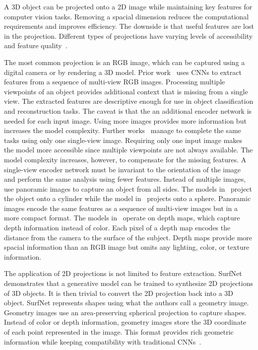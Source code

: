 A 3D object can be projected onto a 2D image while maintaining key features for computer vision tasks. Removing a spacial dimension reduces the computational requirements and improves efficiency. The downside is that useful features are lost in the projection. Different types of projections have varying levels of accessibility and feature quality~\cite{Ahmed2018}.

The most common projection is an RGB image, which can be captured using a digital camera or by rendering a 3D model. Prior work~\cite{Zhu2014, Su2015, Choy2016, Smith2018} uses CNNs to extract features from a sequence of multi-view RGB images. Processing multiple viewpoints of an object provides additional context that is missing from a single view. The extracted features are descriptive enough for use in object classification and reconstruction tasks. The caveat is that the an additional encoder network is needed for each input image. Using more images provides more information but increases the model complexity. Further works~\cite{Fan2017, Wang2018, Niu2018, Genova2020, Pan2019} manage to complete the same tasks using only one single-view image. Requiring only one input image makes the model more accessible since multiple viewpoints are not always available. The model complexity increases, however, to compensate for the missing features. A single-view encoder network must be invariant to the orientation of the image and perform the same analysis using fewer features. Instead of multiple images, \cite{Shi2015, Sfikas2017, Cao2017} use panoramic images to capture an object from all sides. The models in~\cite{Shi2015, Sfikas2017} project the object onto a cylinder while the model in~\cite{Cao2017} projects onto a sphere. Panoramic images encode the same features as a sequence of multi-view images but in a more compact format. The models in~\cite{Zhu2014, Genova2020, Shi2015, Sfikas2017, Cao2017} operate on depth maps, which capture depth information instead of color. Each pixel of a depth map encodes the distance from the camera to the surface of the subject. Depth maps provide more spacial information than an RGB image but omits any lighting, color, or texture information.

The application of 2D projections is not limited to feature extraction. SurfNet~\cite{Sinha2017} demonstrates that a generative model can be trained to synthesize 2D projections of 3D objects. It is then trivial to convert the 2D projection back into a 3D object. SurfNet represents shapes using what the authors call a geometry image. Geometry images use an area-preserving spherical projection to capture shapes. Instead of color or depth information, geometry images store the 3D coordinate of each point represented in the image. This format provides rich geometric information while keeping compatibility with traditional CNNs~\cite{Sinha2017}.

